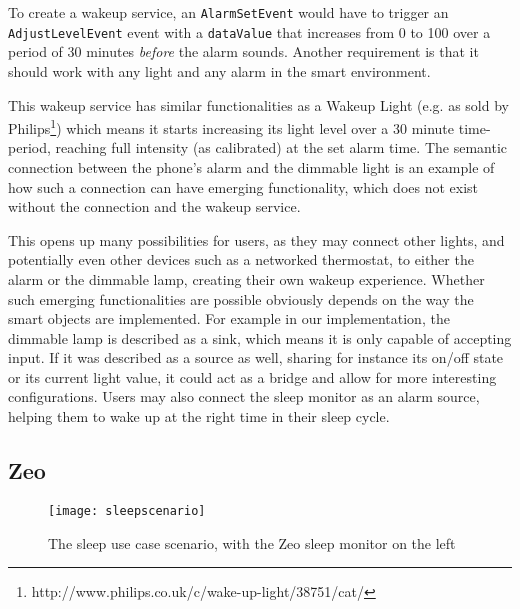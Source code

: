 To create a wakeup service, an \texttt{AlarmSetEvent} would have to trigger an \texttt{AdjustLevelEvent} event with a \texttt{dataValue} that increases from 0 to 100 over a period of 30 minutes \emph{before} the alarm sounds. Another requirement is that it should work with any light and any alarm in the smart environment. 


This wakeup service has similar functionalities as a Wakeup Light (e.g. as sold by Philips\footnote{http://www.philips.co.uk/c/wake-up-light/38751/cat/}) which means it starts increasing its light level over a 30 minute time-period, reaching full intensity (as calibrated) at the set alarm time. The semantic connection between the phone's alarm and the dimmable light is an example of how such a connection can have emerging functionality, which does not exist without the connection and the wakeup service.  

This opens up many possibilities for users, as they may connect other lights, and potentially even other devices such as a networked thermostat, to either the alarm or the dimmable lamp, creating their own wakeup experience. Whether such emerging functionalities are possible obviously depends on the way the smart objects are implemented. For example in our implementation, the dimmable lamp is described as a sink, which means it is only capable of accepting input. If it was described as a source as well, sharing for instance its on/off state or its current light value, it could act as a bridge and allow for more interesting configurations. Users may also connect the sleep monitor as an alarm source, helping them to wake up at the right time in their sleep cycle.


\subsection{Zeo}

\begin{figure}
\centering
\texttt{[image: sleepscenario]}
\caption{The sleep use case scenario, with the Zeo sleep monitor on the left}
\label{sleepusecase}
\end{figure}

